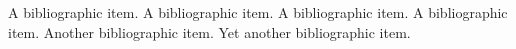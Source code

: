 \documentclass[12pt]{template/nuthesis}
\begin{document}

%

%




























%
\begin{singlespace}
\clearpage{} %
\begin{thebibliography}{xxx}

 A bibliographic item.  A bibliographic item.  A
bibliographic item.  A bibliographic item.
 Another bibliographic item.  
 Yet another bibliographic item.  
\end{thebibliography}
\end{singlespace}

% 


\appendix		%
\end{document}
